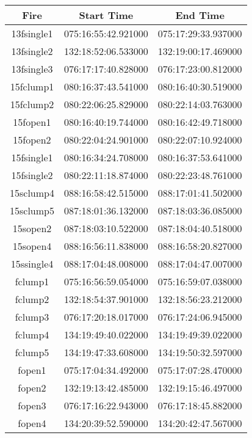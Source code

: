 \documentclass{article}
\begin{document}
\begin{table}
\begin{center}
\begin{tabular}{ |c| c| c| }
\hline
 Fire & Start Time & End Time \\ 
 \hline
 13fsingle1 & 075:16:55:42.921000 & 075:17:29:33.937000 \\  
 \hline
 13fsingle2 & 132:18:52:06.533000 & 132:19:00:17.469000   \\ 
 \hline
 13fsingle3 & 076:17:17:40.828000 & 076:17:23:00.812000   \\ 
\hline
 15fclump1 & 080:16:37:43.541000 & 080:16:40:30.519000 \\
\hline
15fclump2 & 080:22:06:25.829000 & 080:22:14:03.763000 \\
\hline
15fopen1 & 080:16:40:19.744000 & 080:16:42:49.718000 \\
\hline
15fopen2 & 080:22:04:24.901000 & 080:22:07:10.924000 \\
\hline
15fsingle1 & 080:16:34:24.708000 & 080:16:37:53.641000 \\
\hline
15fsingle2 & 080:22:11:18.874000 & 080:22:23:48.761000 \\
\hline
15sclump4 & 088:16:58:42.515000 & 088:17:01:41.502000 \\
\hline
15sclump5 & 087:18:01:36.132000 & 087:18:03:36.085000 \\
\hline
15sopen2 & 087:18:03:10.522000 & 087:18:04:40.518000 \\
\hline
15sopen4 & 088:16:56:11.838000 & 088:16:58:20.827000 \\
\hline
15ssingle4 & 088:17:04:48.008000 & 088:17:04:47.007000 \\
\hline
fclump1 & 075:16:56:59.054000 & 075:16:59:07.038000 \\
\hline
fclump2 & 132:18:54:37.901000 & 132:18:56:23.212000 \\
\hline
fclump3 & 076:17:20:18.017000 & 076:17:24:06.945000 \\
\hline
fclump4 & 134:19:49:40.022000 & 134:19:49:39.022000 \\
\hline
fclump5 & 134:19:47:33.608000 & 134:19:50:32.597000 \\
\hline
fopen1 & 075:17:04:34.492000 & 075:17:07:28.470000 \\
\hline
fopen2 & 132:19:13:42.485000 & 132:19:15:46.497000 \\
\hline
fopen3 & 076:17:16:22.943000 & 076:17:18:45.882000 \\
\hline
fopen4 & 134:20:39:52.590000 & 134:20:42:47.567000 \\

\end{tabular}
\end{center}
\end{table}
\end{document}
